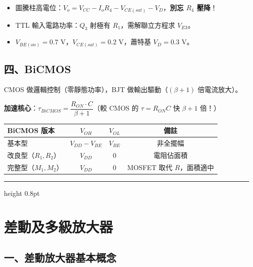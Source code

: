 \documentclass[10pt]{article}
\begin{document}
\begin{trapbox}
\begin{itemize}[leftmargin=1.8em,itemsep=0pt,topsep=1pt]
\item 圖騰柱高電位：$V_o = V_{CC} - I_o R_4 - V_{CE(sat)} - V_D$，\textbf{別忘 $R_4$ 壓降}！
\item TTL 輸入電路功率：$Q_3$ 射極有 $R_1$，需解聯立方程求 $V_{E3}$。
\item $V_{BE(on)} = 0.7$ V，$V_{CE(sat)} = 0.2$ V，蕭特基 $V_D = 0.3$ V。
\end{itemize}
\end{trapbox}

\subsection*{四、BiCMOS}

CMOS 做邏輯控制（零靜態功率），BJT 做輸出驅動（$(\beta+1)$ 倍電流放大）。

\begin{formulabox}
\textbf{加速核心}：$\tau_{BiCMOS} = \dfrac{R_{ON} \cdot C}{\beta+1}$\quad（較 CMOS 的 $\tau = R_{ON}C$ 快 $\beta+1$ 倍！）
\end{formulabox}

\renewcommand{\arraystretch}{1.2}
\begin{center}\small
\begin{tabular}{l c c c}
\toprule
\textbf{BiCMOS 版本} & $V_{OH}$ & $V_{OL}$ & \textbf{備註} \\
\midrule
基本型 & $V_{DD}-V_{BE}$ & $V_{BE}$ & 非全擺幅 \\
改良型（$R_1,R_2$） & $V_{DD}$ & $0$ & 電阻佔面積 \\
完整型（$M_1,M_2$） & $V_{DD}$ & $0$ & MOSFET 取代 $R$，面積適中 \\
\bottomrule
\end{tabular}
\end{center}

\bigskip\hrule height 0.8pt\bigskip

\section*{\color{maincol} \quad 差動及多級放大器}

\subsection*{一、差動放大器基本概念}
\end{document}
